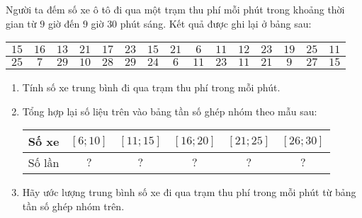 \begin{bt}%
	Người ta đếm số xe ô tô đi qua một trạm thu phí mỗi phút trong khoảng thời gian từ $9$ giờ đến $9$ giờ $30$ phút sáng. Kết quả được ghi lại ở bảng sau:
	\begin{center}
		\begin{tabular}{|c|c|c|c|c|c|c|c|c|c|c|c|c|c|c|}
			\hline $15$ & $16$ & $13$ & $21$ & $17$ & $23$ & $15$ & $21$ & $6$ & $11$ & $12$ & $23$ & $19$ & $25$ & $11$ \\
			\hline $25$ & $7$ & $29$ & $10$ & $28$ & $29$ & $24$ & $6$ & $11$ & $23$ & $11$ & $21$ & $9$ & $27$ & $15$ \\
			\hline
		\end{tabular}
	\end{center}
	\begin{enumerate}
		\item Tính số xe trung bình đi qua trạm thu phí trong mỗi phút.
		\item Tổng hợp lại số liệu trên vào bảng tần số ghép nhóm theo mẫu sau:
		\begin{center}
			\begin{tabular}{|c|c|c|c|c|c|}
				\hline Số xe &{$[6; 10]$} &{$[11; 15]$} &{$[16; 20]$} &{$[21; 25]$} &{$[26; 30]$} \\
				\hline Số lần & $?$ & $?$ & $?$ & $?$ & $?$ \\
				\hline
			\end{tabular}
		\end{center}
		\item Hãy ước lượng trung bình số xe đi qua trạm thu phí trong mỗi phút từ bảng tần số ghép nhóm trên.
	\end{enumerate}
\end{bt}
